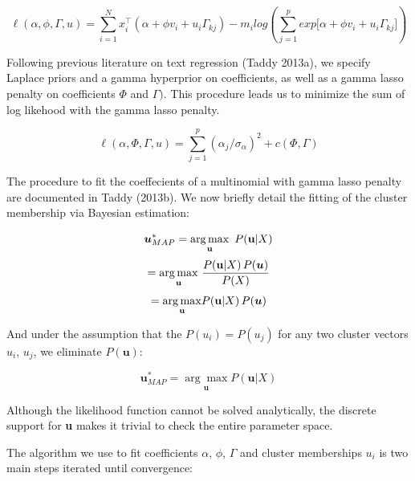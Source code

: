 \documentclass[12pt]{article}
\begin{document}
\begin{equation} 
\ell(\alpha,\phi,\Gamma,u) = \sum_{i = 1}^{N}{ x_i^\top (\alpha + \phi v_i + u_i \Gamma_{kj})} - m_i log(\sum_{j = 1}^{p}{exp{\big[ \alpha + \phi v_i + u_i \Gamma_{kj} \big]}})
\end{equation}

Following previous literature on text regression (Taddy 2013a), we specify Laplace priors and a gamma hyperprior on coefficients, as well as a gamma lasso penalty on coefficients $\Phi$ and $\Gamma)$. This
procedure leads us to minimize the sum of log likehood with the gamma lasso penalty.

\begin{equation}
\ell(\alpha,\Phi,\Gamma,u) = \sum_{j=1}^{p}(\alpha_j/ \sigma_\alpha)^2 + c(\Phi,\Gamma) 
\end{equation}


The procedure to fit the coeffecients of a multinomial with gamma lasso penalty are documented in Taddy (2013b). We now briefly detail the fitting of the cluster membership via Bayesian estimation:

\begin{equation}
\boldsymbol{u}^{*}_{MAP}  = \underset{\mathbf{u}}{\arg\max} \, \, \, P( \mathbf{u} | X) \\
\end{equation}
\begin{equation}
= \underset{\mathbf{u}}{\arg\max} \, \, \frac{P( \mathbf{u} | X) \, P(\boldsymbol{u})}{P(X)}    \\
\end{equation}
\begin{equation}
= \underset{\mathbf{u}}{\arg\max} P( \mathbf{u} | X) \, P(\boldsymbol{u})  \\
\end{equation}

And under the assumption that the $P(u_i) = P(u_j)$ for any two cluster vectors $u_i$, $u_j$, we eliminate $P(\boldsymbol{u})$:

\begin{equation}
\boldsymbol{u}^{*}_{MAP} = \underset{\mathbf{u}}{\arg\max} P( \mathbf{u} | X)
\end{equation}


Although the likelihood function cannot be solved analytically, the discrete support for \textbf{u} makes it trivial to check the entire parameter space.


 The algorithm we use to fit coefficients $\alpha$, $\phi$, $\Gamma$
and cluster memberships $u_i$ is two main steps iterated until
convergence:
\end{document}
